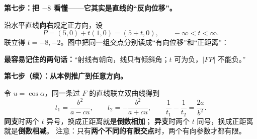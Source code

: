 \clearpage
\begin{explanationbox}
  \textbf{第七步：把 $-8$ 看懂——它其实是直线的“反向位移”。}

  沿水平直线\textbf{向右}规定正方向，设
  \[
    P=(5,0)+t(1,0)=(5+t,0),\qquad -\infty<t<\infty.
  \]
  联立得 $t=-8,-2$。图中把同一组交点分别读成“有向位移”和“正距离”：
  \begin{center}\end{center}
  \textbf{最容易记住的两句话：}“射线有朝向，线只有倾斜角；$t$ 可为负，$|FP|$ 不能负。”

\end{explanationbox}
\clearpage
\begin{explanationbox}
  \textbf{第七步（续）：从本例推广到任意方向。}

  令 $u=\cos\alpha$，同一条过 $F$ 的直线联立双曲线得到
  \[
    \boxed{t_1=\frac{b^2}{a-cu}},\qquad
    \boxed{t_2=-\frac{b^2}{a+cu}},\qquad
    \boxed{\frac1{t_1}-\frac1{t_2}=\frac{2a}{b^2}}.
  \]
  \textbf{同支}时两个 $t$ 异号，换成正距离就是\textbf{倒数相加}；
  \textbf{异支}时两个 $t$ 同号，换成正距离就是\textbf{倒数相减}。
  注意：只有\textbf{两个不同的有限交点}时，两个有向参数才都有限。
\end{explanationbox}
